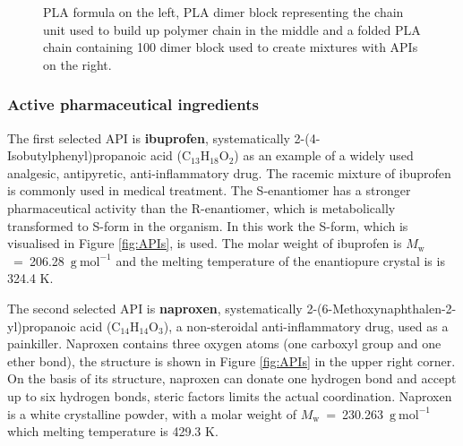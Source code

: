 \begin{figure}[htb]
\begin{subfigure}{0.33\textwidth}
	\end{subfigure}
	\caption{PLA formula on the left, PLA dimer block representing the chain unit used to build up polymer chain in the middle and a folded PLA chain containing 100 dimer block used to create mixtures with APIs on the right.}
	\vspace{-0.5cm}
	\label{fig:pla}
\end{figure}

\subsubsection{Active pharmaceutical ingredients}

The first selected API is \textbf{ibuprofen}, systematically 2-(4-Isobutylphenyl)propanoic acid (C$_{13}$H$_{18}$O$_{2}$) as an example of a widely used analgesic, antipyretic, anti-inflammatory drug. The racemic mixture of ibuprofen is commonly used in medical treatment. The S-enantiomer has a stronger pharmaceutical activity than the R-enantiomer, which is metabolically transformed to S-form in the organism. \cite{rainsford_ibuprofen_2009} In this work the S-form, which is visualised in Figure \ref{fig:APIs}, is used. The molar weight of ibuprofen is $M_\mathrm{w}$~=~206.28~$\mathrm{g\ mol^{-1}}$ and the melting temperature of the enantiopure crystal is is 324.4 K. \cite{stejfa_heat_2021} 

The second selected API is \textbf{naproxen}, systematically 2-(6-Methoxynaphthalen-2-yl)propanoic acid (C$_{14}$H$_{14}$O$_{3}$), a non-steroidal anti-inflammatory drug, used as a painkiller. Naproxen contains three oxygen atoms (one carboxyl group and one ether bond), the structure is shown in Figure \ref{fig:APIs} in the upper right corner. On the basis of its structure, naproxen can donate one hydrogen bond and accept up to six hydrogen bonds, steric factors limits the actual coordination. Naproxen is a white crystalline powder, with a molar weight of $M_\mathrm{w}$~=~230.263~$\mathrm{g\ mol^{-1}}$ which melting temperature is 429.3 K. \cite{stejfa_heat_2021}

